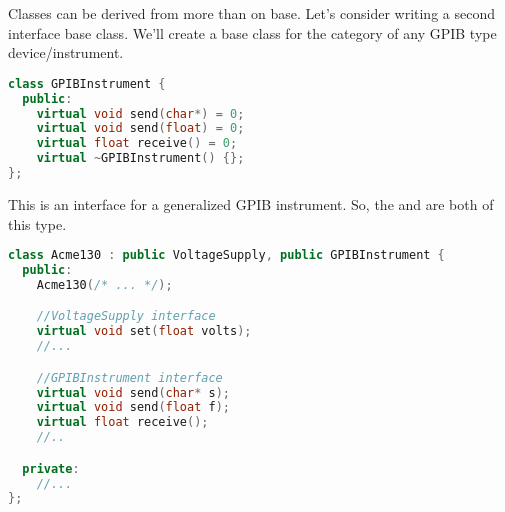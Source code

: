 Classes can be derived from more than on base. Let's consider writing a second interface base class. We'll create a base class for the category of any GPIB type device/instrument.

\begin{lstlisting}[language=C++]
class GPIBInstrument {
  public:
    virtual void send(char*) = 0;
    virtual void send(float) = 0;
    virtual float receive() = 0;
    virtual ~GPIBInstrument() {};
};
\end{lstlisting}

This is an interface for a generalized GPIB instrument. So, the  and  are both of this type.

\begin{lstlisting}[language=C++]
class Acme130 : public VoltageSupply, public GPIBInstrument {
  public:
    Acme130(/* ... */);

    //VoltageSupply interface
    virtual void set(float volts);
    //...

    //GPIBInstrument interface
    virtual void send(char* s);
    virtual void send(float f);
    virtual float receive();
    //..

  private:
    //...
};
\end{lstlisting}

